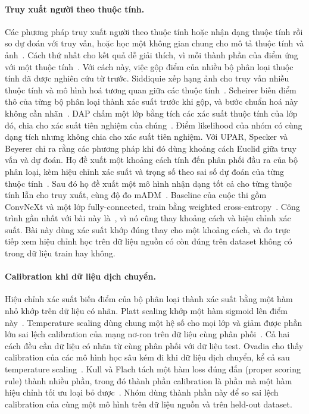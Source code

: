 \documentclass[10pt,twocolumn,letterpaper]{article}
\begin{document}
\paragraph{Truy xuất người theo thuộc tính.} Các phương pháp truy xuất người theo thuộc tính hoặc nhận dạng thuộc tính rồi so dự đoán với truy vấn, hoặc học một không gian chung cho mô tả thuộc tính và ảnh~\cite{upar}. Cách thứ nhất cho kết quả dễ giải thích, vì mỗi thành phần của điểm ứng với một thuộc tính~\cite{upar}. Với cách này, việc gộp điểm của nhiều bộ phân loại thuộc tính đã được nghiên cứu từ trước. Siddiquie \etal xếp hạng ảnh cho truy vấn nhiều thuộc tính và mô hình hoá tương quan giữa các thuộc tính~\cite{siddiquie}. Scheirer \etal biến điểm thô của từng bộ phân loại thành xác suất trước khi gộp, và bước chuẩn hoá này không cần nhãn~\cite{scheirer}. DAP chấm một lớp bằng tích các xác suất thuộc tính của lớp đó, chia cho xác suất tiên nghiệm của chúng~\cite{dap}. Điểm likelihood của nhóm có cùng dạng tích nhưng không chia cho xác suất tiên nghiệm. Với UPAR, Specker và Beyerer chỉ ra rằng các phương pháp khi đó dùng khoảng cách Euclid giữa truy vấn và dự đoán. Họ đề xuất một khoảng cách tính đến phân phối đầu ra của bộ phân loại, kèm hiệu chỉnh xác suất và trọng số theo sai số dự đoán của từng thuộc tính~\cite{specker21}. Sau đó họ đề xuất một mô hình nhận dạng tốt cả cho từng thuộc tính lẫn cho truy xuất, cùng độ đo mADM~\cite{specker23}. Baseline của cuộc thi gồm ConvNeXt và một lớp fully-connected, train bằng weighted cross-entropy~\cite{upar23}. Công trình gần nhất với bài này là~\cite{specker21}, vì nó cũng thay khoảng cách và hiệu chỉnh xác suất. Bài này dùng xác suất khớp đúng thay cho một khoảng cách, và đo trực tiếp xem hiệu chỉnh học trên dữ liệu nguồn có còn đúng trên dataset không có trong dữ liệu train hay không.

\paragraph{Calibration khi dữ liệu dịch chuyển.} Hiệu chỉnh xác suất biến điểm của bộ phân loại thành xác suất bằng một hàm nhỏ khớp trên dữ liệu có nhãn. Platt scaling khớp một hàm sigmoid lên điểm này~\cite{platt}. Temperature scaling dùng chung một hệ số cho mọi lớp và giảm được phần lớn sai lệch calibration của mạng nơ-ron trên dữ liệu cùng phân phối~\cite{guo}. Cả hai cách đều cần dữ liệu có nhãn từ cùng phân phối với dữ liệu test. Ovadia \etal cho thấy calibration của các mô hình học sâu kém đi khi dữ liệu dịch chuyển, kể cả sau temperature scaling~\cite{ovadia}. Kull và Flach tách một hàm loss đúng đắn (proper scoring rule) thành nhiều phần, trong đó thành phần calibration là phần mà một hàm hiệu chỉnh tối ưu loại bỏ được~\cite{kull}. Nhóm dùng thành phần này để so sai lệch calibration của cùng một mô hình trên dữ liệu nguồn và trên held-out dataset.
\end{document}

